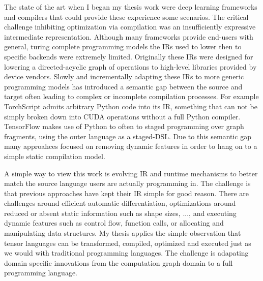 The state of the art when I began my thesis work were
  deep learning frameworks and compilers that could provide
  these experience some scenarios.
The critical challenge inhibiting optimization via compilation
  was an insufficiently expressive intermediate representation.
Although many frameworks provide end-users with general, turing
  complete programming models the IRs used to lower then to specific
  backends were extremely limited.
Originally these IRs were designed for lowering a directed-acyclic
  graph of operations to high-level libraries provided by device vendors.
Slowly and incrementally adapting these IRs to more generic programming
  models has introduced a semantic gap between the source and target often
  leading to complex or incomplete compilation processes.
For example TorchScript admits arbitrary Python code into its IR, something
  that can not be simply broken down into CUDA operations without a full Python compiler.
TensorFlow makes use of Python to often to staged programming over graph fragments,
  using the outer language as a staged-DSL.
Due to this semantic gap many approahces focused on removing dynamic features in
  order to hang on to a simple static compilation model.

A simple way to view this work is evolving IR and runtime mechanisms to better
  match the source language users are actually programming in.
The challenge is that previous approaches have kept their IR simple for good
  reason.
There are challenges around efficient automatic differentiation, optimizations around
  reduced or absent static information such as shape sizes, ..., and executing dynamic
  features such as control flow, function calls, or allocating and manipulating data
  structures.
My thesis applies the simple observation that tensor languages can be transformed, compiled,
  optimized and executed just as we would with traditional programming languages.
The challenge is adapating domain specific innovations from the computation graph
    domain to a full programming language.


